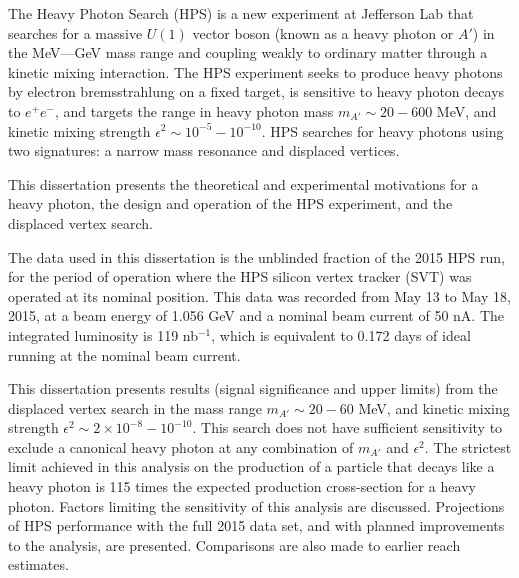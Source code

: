 
The Heavy Photon Search (HPS) is a new experiment at Jefferson Lab that searches for a massive $U(1)$ vector boson (known as a heavy photon or $A'$) in the MeV---GeV mass range and coupling weakly to ordinary matter through a kinetic mixing interaction.
The HPS experiment seeks to produce heavy photons by electron bremsstrahlung on a fixed target, is sensitive to heavy photon decays to $e^+e^-$, and targets the range in heavy photon mass $m_{A'} \sim 20-600$ MeV, and kinetic mixing strength $\epsilon^2 \sim 10^{-5}-10^{-10}$.
HPS searches for heavy photons using two signatures: a narrow mass resonance and displaced vertices.

This dissertation presents the theoretical and experimental motivations for a heavy photon, the design and operation of the HPS experiment, and the displaced vertex search.

The data used in this dissertation is the unblinded fraction of the 2015 HPS run, for the period of operation where the HPS silicon vertex tracker (SVT) was operated at its nominal position.
This data was recorded from May 13 to May 18, 2015, at a beam energy of 1.056 GeV and a nominal beam current of 50 nA.
The integrated luminosity is 119 nb$^{-1}$, which is equivalent to 0.172 days of ideal running at the nominal beam current.

This dissertation presents results (signal significance and upper limits) from the displaced vertex search in the mass range $m_{A'} \sim 20-60$ MeV, and kinetic mixing strength $\epsilon^2 \sim 2\times 10^{-8}-10^{-10}$.
This search does not have sufficient sensitivity to exclude a canonical heavy photon at any combination of $m_{A'}$ and $\epsilon^2$.
The strictest limit achieved in this analysis on the production of a particle that decays like a heavy photon is 115 times the expected production cross-section for a heavy photon.
Factors limiting the sensitivity of this analysis are discussed.
Projections of HPS performance with the full 2015 data set, and with planned improvements to the analysis, are presented.
Comparisons are also made to earlier reach estimates.

